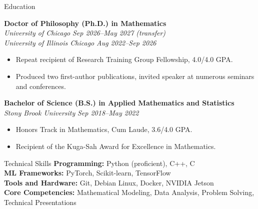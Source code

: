\documentclass{resume} %
\begin{document}
\begin{rSection}{Education}

{\bf Doctor of Philosophy (Ph.D.) in Mathematics} \\
{\it University of Chicago} \hfill {\it Sep 2026--May 2027 (transfer)} \\
{\it University of Illinois Chicago} \hfill {\it Aug 2022--Sep 2026}
\begin{itemize} \itemsep -0.5em \vspace{-0.5em}
    \item Repeat recipient of Research Training Group Fellowship, 4.0/4.0 GPA.
    \item Produced two first-author publications, invited speaker at numerous seminars 
    and conferences.
\end{itemize}

{\bf Bachelor of Science (B.S.) in Applied Mathematics and Statistics} \\
{\it Stony Brook University} \hfill {\it Sep 2018--May 2022}
\begin{itemize} \itemsep -0.5em \vspace{-0.5em}
    \item Honors Track in Mathematics, Cum Laude, 3.6/4.0 GPA.
    \item Recipient of the Kuga-Sah Award for Excellence in Mathematics.
\end{itemize}

\end{rSection}


\begin{rSection}{Technical Skills} 
{\bf Programming:} Python (proficient), C++, C \\
{\bf ML Frameworks:} PyTorch, Scikit-learn, TensorFlow \\
{\bf Tools and Hardware:} Git, Debian Linux, Docker, NVIDIA Jetson \\
{\bf Core Competencies:} Mathematical Modeling, Data Analysis, Problem Solving, Technical Presentations

\end{rSection}




\end{document}
